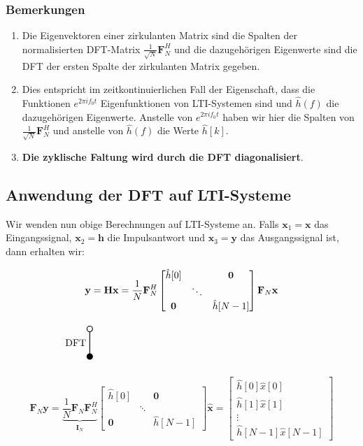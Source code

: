 \documentclass[11pt]{article}
\newcommand{\verticaltransform}[4]{%
    \begin{tikzpicture}
        \filldraw[thick] (0,0) circle (0.1) node[below=3pt] {$#4$};
        \draw[thick] (0,0.1) -- (0,#2 -0.1) node[midway, left] {#1};
        \draw[thick] (0,#2) circle (0.1) node[above=3pt] {$#3$};
    \end{tikzpicture}%
}
\begin{document}
\subsubsection*{Bemerkungen}

\begin{enumerate}
    \item Die Eigenvektoren einer zirkulanten Matrix sind die Spalten der normalisierten DFT-Matrix $\frac{1}{\sqrt{N}}\mathbf{F}_N^H$ und die dazugehörigen Eigenwerte sind die DFT der ersten Spalte der zirkulanten Matrix gegeben. 
    \item Dies entspricht im zeitkontinuierlichen Fall der Eigenschaft, dass die
    Funktionen $e^{2 \pi i f_0 t}$ Eigenfunktionen von LTI-Systemen sind und $\hat{h}(f)$ die dazugehörigen Eigenwerte. Anstelle von $e^{2 \pi i f_0 t}$ haben wir hier die Spalten von $\frac{1}{\sqrt{N}}\mathbf{F}_N^H$ und anstelle von $\hat{h}(f)$ die Werte $\hat{h}[k]$.
    \item \textbf{Die zyklische Faltung wird durch die DFT diagonalisiert}.
\end{enumerate}


\subsection*{Anwendung der DFT auf LTI-Systeme}
\vspace*{-0.5cm}

Wir wenden nun obige Berechnungen auf LTI-Systeme an. Falls $\mathbf{x}_1 = \mathbf{x}$ das Eingangssignal, $\mathbf{x}_2 = \mathbf{h}$ die Impulsantwort und $\mathbf{x}_3 = \mathbf{y}$ das Ausgangssignal ist, dann erhalten wir:

\pagebreak

$$\vspace*{-0.75cm}\mathbf{y} = \mathbf{H}\mathbf{x} =  \frac{1}{N} \mathbf{F}_N^H  \begin{bmatrix}
    \hat{h}[0] & & \mathbf{0} \\
    & \ddots & \\
    \mathbf{0} & & \hat{h}[N-1]
\end{bmatrix} \mathbf{F}_N \mathbf{x}$$
$$\vspace*{-1cm}\verticaltransform{\text{DFT}}{1}{}{} \hspace{7.5cm}$$
$$\mathbf{F}_N \mathbf{y} = \underbrace{\frac{1}{N} \mathbf{F}_N \mathbf{F}_N^H}_{\mathbf{I}_N}  \begin{bmatrix}
    \hat{h}[0] & & \mathbf{0} \\
    & \ddots & \\
    \mathbf{0} & & \hat{h}[N-1]
\end{bmatrix} \hat{\mathbf{x}} = \begin{bmatrix}
    \hat{h}[0] \hat{x}[0] \\
    \hat{h}[1] \hat{x}[1] \\
    \vdots \\
    \hat{h}[N-1] \hat{x}[N-1]
\end{bmatrix}$$
\end{document}

